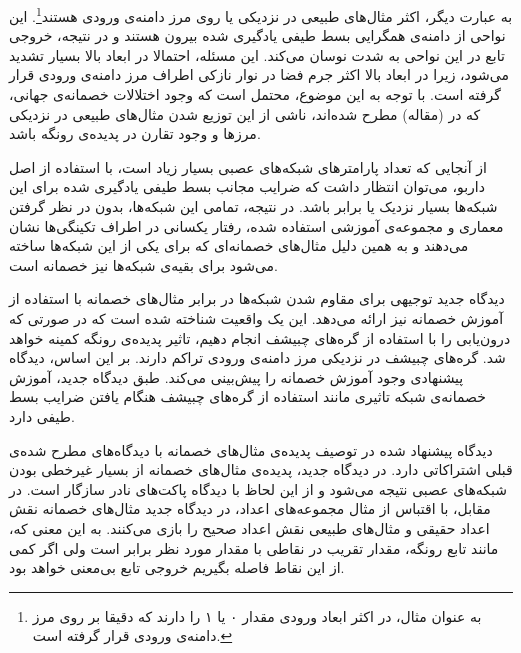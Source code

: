 \documentclass[12pt,onecolumn,a4paper]{article}
\begin{document}
به عبارت دیگر، اکثر مثال‌های طبیعی در نزدیکی یا روی مرز دامنه‌ی ورودی هستند\footnote{به عنوان مثال، در 
اکثر ابعاد ورودی مقدار ۰ یا ۱ را دارند که دقیقا بر روی مرز دامنه‌ی ورودی قرار گرفته است.}.
این نواحی از دامنه‌ی همگرایی بسط طیفی یادگیری شده بیرون هستند و در نتیجه، خروجی تابع در این نواحی به شدت نوسان می‌کند. این مسئله، احتمالا در ابعاد بالا بسیار تشدید می‌شود، زیرا در ابعاد بالا اکثر جرم فضا در نوار نازکی اطراف مرز دامنه‌ی ورودی قرار گرفته است. با توجه به این موضوع، محتمل است که وجود اختلالات خصمانه‌ی جهانی، که در (مقاله) مطرح شده‌اند، ناشی از این توزیع شدن مثال‌های طبیعی در نزدیکی مرزها و وجود تقارن در پدیده‌ی رونگه باشد.

از آنجایی که تعداد پارامترهای شبکه‌های عصبی بسیار زیاد است، با استفاده از اصل داربو، می‌توان انتظار داشت که ضرایب مجانب بسط طیفی یادگیری شده برای این شبکه‌ها بسیار نزدیک یا برابر باشد. در نتیجه، تمامی این شبکه‌ها، بدون در نظر گرفتن معماری و مجموعه‌ی آموزشی استفاده شده، رفتار یکسانی در اطراف تکینگی‌ها نشان می‌دهند و به همین دلیل مثال‌های خصمانه‌ای که برای یکی از این شبکه‌ها ساخته می‌شود برای بقیه‌ی شبکه‌ها نیز خصمانه است.

دیدگاه جدید توجیهی برای مقاوم شدن شبکه‌ها در برابر مثال‌های خصمانه با استفاده از آموزش خصمانه نیز ارائه می‌دهد. این یک واقعیت شناخته شده است که در صورتی که درون‌یابی را با استفاده از گره‌های چبیشف انجام دهیم، تاثیر پدیده‌ی رونگه کمینه خواهد شد. گره‌های چبیشف در نزدیکی مرز دامنه‌ی ورودی تراکم دارند. بر این اساس، دیدگاه پیشنهادی وجود آموزش خصمانه را پیش‌بینی می‌کند. طبق دیدگاه جدید، آموزش خصمانه‌ی شبکه تاثیری مانند استفاده از گره‌های چبیشف هنگام یافتن ضرایب بسط طیفی دارد.

دیدگاه پیشنهاد شده در توصیف پدیده‌ی مثال‌های خصمانه با دیدگاه‌های مطرح شده‌ی قبلی اشتراکاتی دارد. در دیدگاه جدید، پدیده‌ی مثال‌های خصمانه از بسیار غیرخطی بودن شبکه‌های عصبی نتیجه می‌شود و از این لحاظ با دیدگاه پاکت‌های نادر سازگار است. در مقابل، با اقتباس از مثال مجموعه‌های اعداد، در دیدگاه جدید مثال‌های خصمانه نقش اعداد حقیقی و مثال‌های طبیعی نقش اعداد صحیح را بازی می‌کنند. به این معنی که، مانند تابع رونگه، مقدار تقریب در نقاطی با مقدار مورد نظر برابر است ولی اگر کمی از این نقاط فاصله بگیریم خروجی تابع بی‌معنی خواهد بود.
\end{document}
